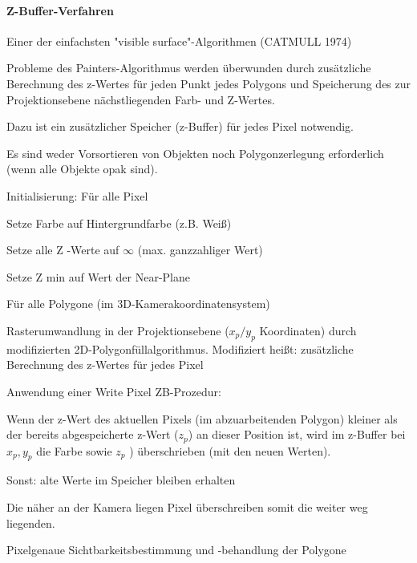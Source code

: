 \documentclass[landscape]{article}
\begin{document}
\begin{multicols}{3}
  \paragraph{Z-Buffer-Verfahren}
  \begin{itemize*}
    \item Einer der einfachsten "visible surface"-Algorithmen (CATMULL 1974)
    \item Probleme des Painters-Algorithmus werden überwunden durch zusätzliche Berechnung des z-Wertes für jeden Punkt jedes Polygons und Speicherung des zur Projektionsebene nächstliegenden Farb- und Z-Wertes.
    \item Dazu ist ein zusätzlicher Speicher (z-Buffer) für jedes Pixel notwendig.
    \item Es sind weder Vorsortieren von Objekten noch Polygonzerlegung erforderlich (wenn alle Objekte opak sind).
  \end{itemize*}
  
  Initialisierung: Für alle Pixel
  \begin{itemize*}
    \item Setze Farbe auf Hintergrundfarbe (z.B. Weiß)
    \item Setze alle Z -Werte auf $\infty$ (max. ganzzahliger Wert)
    \item Setze Z min auf Wert der Near-Plane
  \end{itemize*}
  
  Für alle Polygone (im 3D-Kamerakoordinatensystem)
  \begin{itemize*}
    \item Rasterumwandlung in der Projektionsebene ($x_p/y_p$ Koordinaten) durch modifizierten 2D-Polygonfüllalgorithmus. Modifiziert heißt: zusätzliche Berechnung des z-Wertes für jedes Pixel
    \item Anwendung einer Write Pixel ZB-Prozedur:
    \item Wenn der z-Wert des aktuellen Pixels (im abzuarbeitenden Polygon) kleiner als der bereits abgespeicherte z-Wert ($z_p$) an dieser Position ist, wird im z-Buffer bei $x_p , y_p$ die Farbe sowie $z_p$ ) überschrieben (mit den neuen Werten).
    \item Sonst: alte Werte im Speicher bleiben erhalten
    \item Die näher an der Kamera liegen Pixel überschreiben somit die weiter weg liegenden.
    \item Pixelgenaue Sichtbarkeitsbestimmung und -behandlung der Polygone
  \end{itemize*}
  

\end{multicols}
\end{document}
